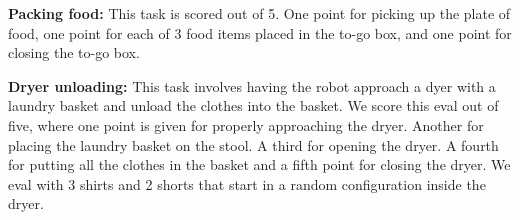 \noindent \textbf{Packing food:} This task is scored out of 5. One point for picking up the plate of food, one point for each of 3 food items placed in the to-go box, and one point for closing the to-go box.

\noindent \textbf{Dryer unloading:} This task involves having the robot approach a dyer with a laundry basket and unload the clothes into the basket. We score this eval out of five, where one point is given for properly approaching the dryer. Another for placing the laundry basket on the stool. A third for opening the dryer. A fourth for putting all the clothes in the basket and a fifth point for closing the dryer. We eval with 3 shirts and 2 shorts that start in a random configuration inside the dryer.
